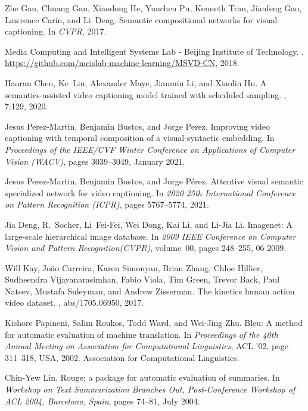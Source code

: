 \documentclass{article}
\begin{document}
\begin{thebibliography}{10}
Zhe Gan, Chuang Gan, Xiaodong He, Yunchen Pu, Kenneth Tran, Jianfeng Gao,
  Lawrence Carin, and Li~Deng.
\newblock Semantic compositional networks for visual captioning.
\newblock In {\em CVPR}, 2017.

{Media Computing and Intelligent Systems Lab - Beijing Institute of
  Technology}.
.
\newblock \url{https://github.com/mcislab-machine-learning/MSVD-CN}, 2018.

Haoran Chen, Ke~Lin, Alexander Maye, Jianmin Li, and Xiaolin Hu.
\newblock A semantics-assisted video captioning model trained with scheduled
  sampling.
, 7:129, 2020.

Jesus Perez-Martin, Benjamin Bustos, and Jorge Perez.
\newblock Improving video captioning with temporal composition of a
  visual-syntactic embedding.
\newblock In {\em Proceedings of the IEEE/CVF Winter Conference on Applications
  of Computer Vision (WACV)}, pages 3039--3049, January 2021.

Jesus Perez-Martin, Benjamin Bustos, and Jorge Pérez.
\newblock Attentive visual semantic specialized network for video captioning.
\newblock In {\em 2020 25th International Conference on Pattern Recognition
  (ICPR)}, pages 5767--5774, 2021.

Jia Deng, R.~Socher, Li~Fei-Fei, Wei Dong, Kai Li, and Li-Jia Li.
\newblock Imagenet: A large-scale hierarchical image database.
\newblock In {\em 2009 IEEE Conference on Computer Vision and Pattern
  Recognition(CVPR)}, volume~00, pages 248--255, 06 2009.

Will Kay, Jo{\~{a}}o Carreira, Karen Simonyan, Brian Zhang, Chloe Hillier,
  Sudheendra Vijayanarasimhan, Fabio Viola, Tim Green, Trevor Back, Paul
  Natsev, Mustafa Suleyman, and Andrew Zisserman.
\newblock The kinetics human action video dataset.
, abs/1705.06950, 2017.

Kishore Papineni, Salim Roukos, Todd Ward, and Wei-Jing Zhu.
\newblock Bleu: A method for automatic evaluation of machine translation.
\newblock In {\em Proceedings of the 40th Annual Meeting on Association for
  Computational Linguistics}, ACL '02, page 311–318, USA, 2002. Association
  for Computational Linguistics.

Chin-Yew Lin.
\newblock Rouge: a package for automatic evaluation of summaries.
\newblock In {\em Workshop on Text Summarization Branches Out, Post-Conference
  Workshop of ACL 2004, Barcelona, Spain}, pages 74--81, July 2004.


\end{thebibliography}
\end{document}

